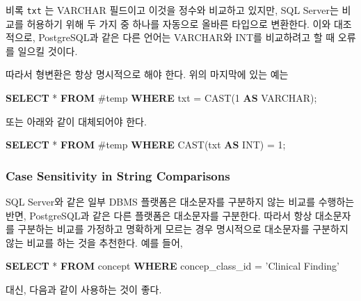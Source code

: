 \documentclass[11pt]{book}
\newenvironment{Shaded}{\begin{snugshade}}{\end{snugshade}}
\newcommand{\KeywordTok}[1]{\textcolor[rgb]{0.13,0.29,0.53}{\textbf{#1}}}
\newcommand{\DataTypeTok}[1]{\textcolor[rgb]{0.13,0.29,0.53}{#1}}
\newcommand{\DecValTok}[1]{\textcolor[rgb]{0.00,0.00,0.81}{#1}}
\newcommand{\StringTok}[1]{\textcolor[rgb]{0.31,0.60,0.02}{#1}}
\newcommand{\FunctionTok}[1]{\textcolor[rgb]{0.00,0.00,0.00}{#1}}
\newcommand{\NormalTok}[1]{#1}
\theoremstyle{definition}
\theoremstyle{definition}
\theoremstyle{definition}
\theoremstyle{remark}
\begin{document}
비록 \texttt{txt} 는 VARCHAR 필드이고 이것을 정수와 비교하고 있지만, SQL
Server는 비교를 허용하기 위해 두 가지 중 하나를 자동으로 올바른 타입으로
변환한다. 이와 대조적으로, PostgreSQL과 같은 다른 언어는 VARCHAR와 INT를
비교하려고 할 때 오류를 일으킬 것이다.

따라서 형변환은 항상 명시적으로 해야 한다. 위의 마지막에 있는 예는

\begin{Shaded}
\begin{Highlighting}[]
\KeywordTok{SELECT}\NormalTok{ * }\KeywordTok{FROM}\NormalTok{ #temp }\KeywordTok{WHERE}\NormalTok{ txt = }\FunctionTok{CAST}\NormalTok{(}\DecValTok{1} \KeywordTok{AS} \DataTypeTok{VARCHAR}\NormalTok{);}
\end{Highlighting}
\end{Shaded}

또는 아래와 같이 대체되어야 한다.

\begin{Shaded}
\begin{Highlighting}[]
\KeywordTok{SELECT}\NormalTok{ * }\KeywordTok{FROM}\NormalTok{ #temp }\KeywordTok{WHERE} \FunctionTok{CAST}\NormalTok{(txt }\KeywordTok{AS} \DataTypeTok{INT}\NormalTok{) = }\DecValTok{1}\NormalTok{;}
\end{Highlighting}
\end{Shaded}

\subsubsection*{Case Sensitivity in String
Comparisons}\label{case-sensitivity-in-string-comparisons}

SQL Server와 같은 일부 DBMS 플랫폼은 대소문자를 구분하지 않는 비교를
수행하는 반면, PostgreSQL과 같은 다른 플랫폼은 대소문자를 구분한다.
따라서 항상 대소문자를 구분하는 비교를 가정하고 명확하게 모르는 경우
명시적으로 대소문자를 구분하지 않는 비교를 하는 것을 추천한다. 예를
들어,

\begin{Shaded}
\begin{Highlighting}[]
\KeywordTok{SELECT}\NormalTok{ * }\KeywordTok{FROM}\NormalTok{ concept }\KeywordTok{WHERE}\NormalTok{ concep_class_id = }\StringTok{'Clinical Finding'}
\end{Highlighting}
\end{Shaded}

대신, 다음과 같이 사용하는 것이 좋다.
\end{document}
